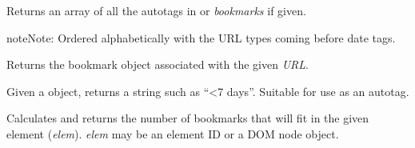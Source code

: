 \documentclass[letterpaper,10pt,openany]{sphinxmanual}
\begin{document}

\begin{fulllineitems}
\label{Applications/terminal/plugin_bookmarks:GateOne.Bookmarks.getAutotags}
Returns an array of all the autotags in  or \emph{bookmarks} if given.

\begin{notice}{note}{Note:}
Ordered alphabetically with the URL types coming before date tags.
\end{notice}

\end{fulllineitems}


\begin{fulllineitems}
\label{Applications/terminal/plugin_bookmarks:GateOne.Bookmarks.getBookmarkObj}
Returns the bookmark object associated with the given \emph{URL}.

\end{fulllineitems}


\begin{fulllineitems}
\label{Applications/terminal/plugin_bookmarks:GateOne.Bookmarks.getDateTag}
Given a  object, returns a string such as ``\textless{}7 days''.  Suitable for use as an autotag.

\end{fulllineitems}


\begin{fulllineitems}
\label{Applications/terminal/plugin_bookmarks:GateOne.Bookmarks.getMaxBookmarks}
Calculates and returns the number of bookmarks that will fit in the given element (\emph{elem}).  \emph{elem} may be an element ID or a DOM node object.

\end{fulllineitems}
\end{document}
